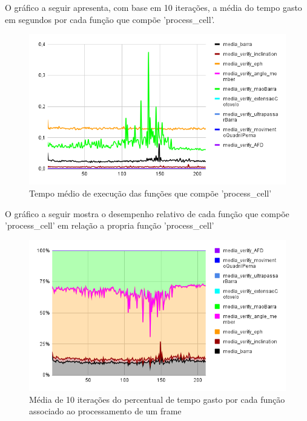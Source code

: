 O gráfico a seguir apresenta, com base em 10 iterações, a média do tempo gasto em segundos por cada função que compõe 'process\_cell'.

\begin{figure}[H]
	\centering
	\caption{Tempo médio de execução das funções que compõe 'process\_cell'}
	\includegraphics[scale=0.7]{figuras/grafico/comp_process_cell_2.png}
\end{figure}


O gráfico a seguir mostra o desempenho relativo de cada função que compõe 'process\_cell' em relação a propria função 'process\_cell'

\begin{figure}[H]
	\centering
	\caption{Média de 10 iterações do percentual de tempo gasto por cada função associado ao processamento de um frame}
	\includegraphics[scale=0.7]{figuras/grafico/comp_process_cell_1.png}
\end{figure}






